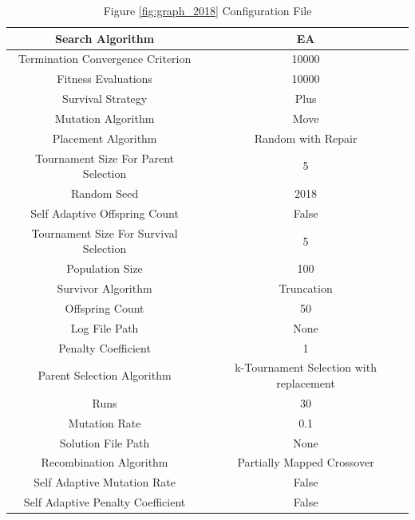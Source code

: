 \documentclass{standalone}
\begin{document}
\begin{table}[!htb]
	\centering
	\caption{Figure \ref{fig:graph_2018} Configuration File}
	\label{tab:graph_2018}
	\begin{tabular}{| c | c |}
		\hline
		Search Algorithm		& EA		 \\
		\hline
		Termination Convergence Criterion		& 10000		 \\
		\hline
		Fitness Evaluations		& 10000		 \\
		\hline
		Survival Strategy		& Plus		 \\
		\hline
		Mutation Algorithm		& Move		 \\
		\hline
		Placement Algorithm		& Random with Repair		 \\
		\hline
		Tournament Size For Parent Selection		& 5		 \\
		\hline
		Random Seed		& 2018		 \\
		\hline
		Self Adaptive Offspring Count		& False		 \\
		\hline
		Tournament Size For Survival Selection		& 5		 \\
		\hline
		Population Size		& 100		 \\
		\hline
		Survivor Algorithm		& Truncation		 \\
		\hline
		Offspring Count		& 50		 \\
		\hline
		Log File Path		& None		 \\
		\hline
		Penalty Coefficient		& 1		 \\
		\hline
		Parent Selection Algorithm		& k-Tournament Selection with replacement		 \\
		\hline
		Runs		& 30		 \\
		\hline
		Mutation Rate		& 0.1		 \\
		\hline
		Solution File Path		& None		 \\
		\hline
		Recombination Algorithm		& Partially Mapped Crossover		 \\
		\hline
		Self Adaptive Mutation Rate		& False		 \\
		\hline
		Self Adaptive Penalty Coefficient		& False		 \\
		\hline
	\end{tabular}
\end{table}
\end{document}
